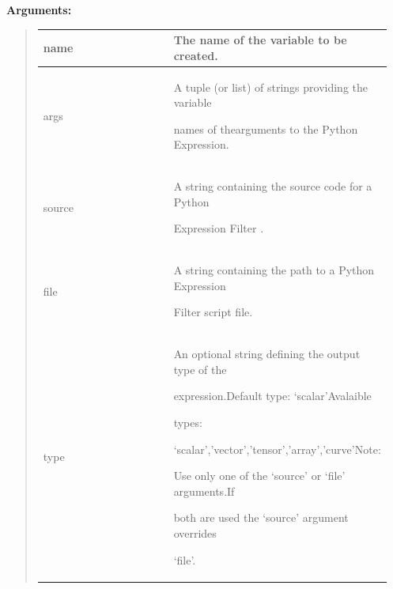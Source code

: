\documentclass[letterpaper,10pt,english]{sphinxmanual}
\begin{document}
\begin{DUlineblock}{0em}
\item[] 
\item[] \textbf{Arguments:}
\end{DUlineblock}
\begin{quote}

\begin{tabular}{|p{0.475\linewidth}|p{0.475\linewidth}|}
\hline

name
 & 
The name of the variable to be created.
\\
\hline
args
 & 
\begin{DUlineblock}{0em}
\item[] A tuple (or list) of strings providing the variable
\item[] names of thearguments to the Python Expression.
\end{DUlineblock}
\\
\hline
source
 & 
\begin{DUlineblock}{0em}
\item[] A string containing the source code for a Python
\item[] Expression Filter .
\end{DUlineblock}
\\
\hline
file
 & 
\begin{DUlineblock}{0em}
\item[] A string containing the path to a Python Expression
\item[] Filter script file.
\end{DUlineblock}
\\
\hline
type
 & 
\begin{DUlineblock}{0em}
\item[] An optional string defining the output type of the
\item[] expression.Default type: `scalar'Avalaible
\item[] types:
\item[] `scalar','vector','tensor','array','curve'Note:
\item[] Use only one of the `source' or `file' arguments.If
\item[] both are used the `source' argument overrides
\item[] `file'.
\end{DUlineblock}
\\
\hline\end{tabular}

\end{quote}
\end{document}

